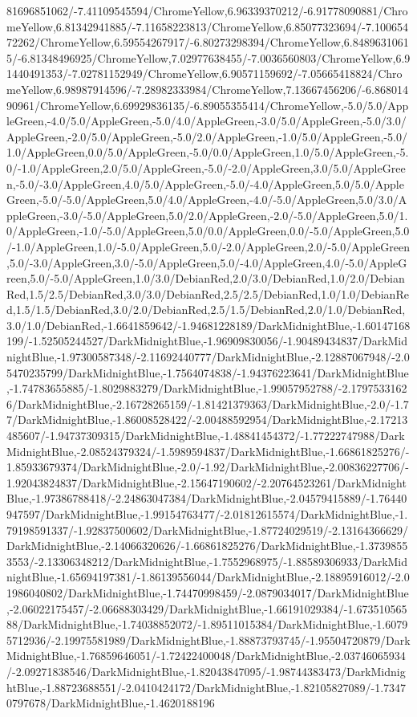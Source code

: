 {\begin{tikzternal}
81696851062/-7.41109545594/ChromeYellow,6.96339370212/-6.91778090881/ChromeYellow,6.81342941885/-7.11658223813/ChromeYellow,6.85077323694/-7.10065472262/ChromeYellow,6.59554267917/-6.80273298394/ChromeYellow,6.84896310615/-6.81348496925/ChromeYellow,7.02977638455/-7.0036560803/ChromeYellow,6.91440491353/-7.02781152949/ChromeYellow,6.90571159692/-7.05665418824/ChromeYellow,6.98987914596/-7.28982333984/ChromeYellow,7.13667456206/-6.86801490961/ChromeYellow,6.69929836135/-6.89055355414/ChromeYellow,-5.0/5.0/AppleGreen,-4.0/5.0/AppleGreen,-5.0/4.0/AppleGreen,-3.0/5.0/AppleGreen,-5.0/3.0/AppleGreen,-2.0/5.0/AppleGreen,-5.0/2.0/AppleGreen,-1.0/5.0/AppleGreen,-5.0/1.0/AppleGreen,0.0/5.0/AppleGreen,-5.0/0.0/AppleGreen,1.0/5.0/AppleGreen,-5.0/-1.0/AppleGreen,2.0/5.0/AppleGreen,-5.0/-2.0/AppleGreen,3.0/5.0/AppleGreen,-5.0/-3.0/AppleGreen,4.0/5.0/AppleGreen,-5.0/-4.0/AppleGreen,5.0/5.0/AppleGreen,-5.0/-5.0/AppleGreen,5.0/4.0/AppleGreen,-4.0/-5.0/AppleGreen,5.0/3.0/AppleGreen,-3.0/-5.0/AppleGreen,5.0/2.0/AppleGreen,-2.0/-5.0/AppleGreen,5.0/1.0/AppleGreen,-1.0/-5.0/AppleGreen,5.0/0.0/AppleGreen,0.0/-5.0/AppleGreen,5.0/-1.0/AppleGreen,1.0/-5.0/AppleGreen,5.0/-2.0/AppleGreen,2.0/-5.0/AppleGreen,5.0/-3.0/AppleGreen,3.0/-5.0/AppleGreen,5.0/-4.0/AppleGreen,4.0/-5.0/AppleGreen,5.0/-5.0/AppleGreen,1.0/3.0/DebianRed,2.0/3.0/DebianRed,1.0/2.0/DebianRed,1.5/2.5/DebianRed,3.0/3.0/DebianRed,2.5/2.5/DebianRed,1.0/1.0/DebianRed,1.5/1.5/DebianRed,3.0/2.0/DebianRed,2.5/1.5/DebianRed,2.0/1.0/DebianRed,3.0/1.0/DebianRed,-1.6641859642/-1.94681228189/DarkMidnightBlue,-1.60147168199/-1.52505244527/DarkMidnightBlue,-1.96909830056/-1.90489434837/DarkMidnightBlue,-1.97300587348/-2.11692440777/DarkMidnightBlue,-2.12887067948/-2.05470235799/DarkMidnightBlue,-1.7564074838/-1.94376223641/DarkMidnightBlue,-1.74783655885/-1.8029883279/DarkMidnightBlue,-1.99057952788/-2.17975331626/DarkMidnightBlue,-2.16728265159/-1.81421379363/DarkMidnightBlue,-2.0/-1.77/DarkMidnightBlue,-1.86008528422/-2.00488592954/DarkMidnightBlue,-2.17213485607/-1.94737309315/DarkMidnightBlue,-1.48841454372/-1.77222747988/DarkMidnightBlue,-2.08524379324/-1.5989594837/DarkMidnightBlue,-1.66861825276/-1.85933679374/DarkMidnightBlue,-2.0/-1.92/DarkMidnightBlue,-2.00836227706/-1.92043824837/DarkMidnightBlue,-2.15647190602/-2.20764523261/DarkMidnightBlue,-1.97386788418/-2.24863047384/DarkMidnightBlue,-2.04579415889/-1.76440947597/DarkMidnightBlue,-1.99154763477/-2.01812615574/DarkMidnightBlue,-1.79198591337/-1.92837500602/DarkMidnightBlue,-1.87724029519/-2.13164366629/DarkMidnightBlue,-2.14066320626/-1.66861825276/DarkMidnightBlue,-1.37398553553/-2.13306348212/DarkMidnightBlue,-1.7552968975/-1.88589306933/DarkMidnightBlue,-1.65694197381/-1.86139556044/DarkMidnightBlue,-2.18895916012/-2.01986040802/DarkMidnightBlue,-1.74470998459/-2.0879034017/DarkMidnightBlue,-2.06022175457/-2.06688303429/DarkMidnightBlue,-1.66191029384/-1.67351056588/DarkMidnightBlue,-1.74038852072/-1.89511015384/DarkMidnightBlue,-1.60795712936/-2.19975581989/DarkMidnightBlue,-1.88873793745/-1.95504720879/DarkMidnightBlue,-1.76859646051/-1.72422400048/DarkMidnightBlue,-2.03746065934/-2.09271838546/DarkMidnightBlue,-1.82043847095/-1.98744383473/DarkMidnightBlue,-1.88723688551/-2.0410424172/DarkMidnightBlue,-1.82105827089/-1.73470797678/DarkMidnightBlue,-1.4620188196
\end{tikzternal}}
